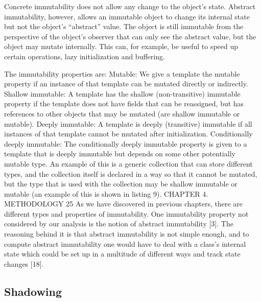 \documentclass[conference]{IEEEtran}
\begin{document}
Concrete immutability does not allow any change to the object’s state. Abstract immutability, however,
allows an immutable object to change its internal state but not the object’s “abstract” value. The object
is still immutable from the perspective of the object’s observer that can only see the abstract value, but
the object may mutate internally. This can, for example, be useful to speed up certain operations, lazy
initialization and buffering.


The immutability properties are:
Mutable: We give a template the mutable property if an instance of that template can be mutated
directly or indirectly.
Shallow immutable: A template has the shallow (non-transitive) immutable property if the template
does not have fields that can be reassigned, but has references to other objects that may be
mutated (are shallow immutable or mutable).
Deeply immutable: A template is deeply (transitive) immutable if all instances of that template
cannot be mutated after initialization.
Conditionally deeply immutable: The conditionally deeply immutable property is given to a
template that is deeply immutable but depends on some other potentially mutable type. An example
of this is a generic collection that can store different types, and the collection itself is declared
in a way so that it cannot be mutated, but the type that is used with the collection may be shallow
immutable or mutable (an example of this is shown in listing 9).
CHAPTER 4. METHODOLOGY 25
As we have discovered in previous chapters, there are different types and properties of immutability.
One immutability property not considered by our analysis is the notion of abstract immutability [3].
The reasoning behind it is that abstract immutability is not simple enough, and to compute abstract immutability
one would have to deal with a class’s internal state which could be set up in a multitude of
different ways and track state changes [18].

\subsection{Shadowing}
\end{document}
